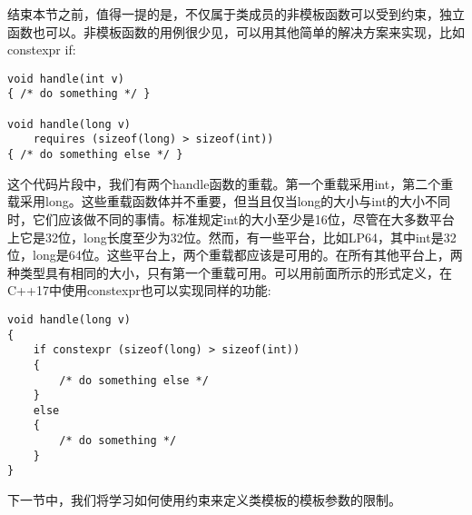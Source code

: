 结束本节之前，值得一提的是，不仅属于类成员的非模板函数可以受到约束，独立函数也可以。非模板函数的用例很少见，可以用其他简单的解决方案来实现，比如constexpr if:

\begin{lstlisting}[style=styleCXX]
void handle(int v)
{ /* do something */ }

void handle(long v)
	requires (sizeof(long) > sizeof(int))
{ /* do something else */ }
\end{lstlisting}

这个代码片段中，我们有两个handle函数的重载。第一个重载采用int，第二个重载采用long。这些重载函数体并不重要，但当且仅当long的大小与int的大小不同时，它们应该做不同的事情。标准规定int的大小至少是16位，尽管在大多数平台上它是32位，long长度至少为32位。然而，有一些平台，比如LP64，其中int是32位，long是64位。这些平台上，两个重载都应该是可用的。在所有其他平台上，两种类型具有相同的大小，只有第一个重载可用。可以用前面所示的形式定义，在C++17中使用constexpr也可以实现同样的功能:

\begin{lstlisting}[style=styleCXX]
void handle(long v)
{
	if constexpr (sizeof(long) > sizeof(int))
	{
		/* do something else */
	}
	else
	{
		/* do something */
	}
}
\end{lstlisting}

下一节中，我们将学习如何使用约束来定义类模板的模板参数的限制。


